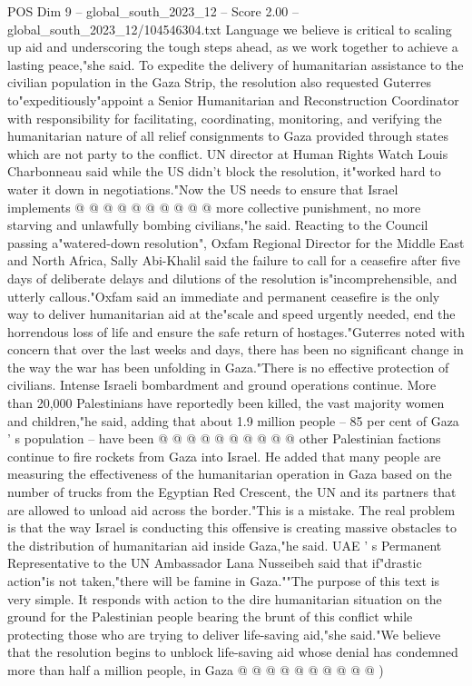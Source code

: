 \begin{textsample}{POS Dim 9 – global\_south\_2023\_12 – Score 2.00 – global\_south\_2023\_12/104546304.txt}
Language we believe is critical to scaling up aid and underscoring the tough steps ahead, as we work together to achieve a lasting peace,"she said.
To expedite the delivery of humanitarian assistance to the civilian population in the Gaza Strip, the resolution also requested Guterres to"expeditiously"appoint a Senior Humanitarian and Reconstruction Coordinator with responsibility for facilitating, coordinating, monitoring, and verifying the humanitarian nature of all relief consignments to Gaza provided through states which are not party to the conflict.
UN director at Human Rights Watch Louis Charbonneau said while the US didn't block the resolution, it"worked hard to water it down in negotiations."Now the US needs to ensure that Israel implements @ @ @ @ @ @ @ @ @ @ more collective punishment, no more starving and unlawfully bombing civilians,"he said.
Reacting to the Council passing a"watered-down resolution", Oxfam Regional Director for the Middle East and North Africa, Sally Abi-Khalil said the failure to call for a ceasefire after five days of deliberate delays and dilutions of the resolution is"incomprehensible, and utterly callous."Oxfam said an immediate and permanent ceasefire is the only way to deliver humanitarian aid at the"scale and speed urgently needed, end the horrendous loss of life and ensure the safe return of hostages."Guterres noted with concern that over the last weeks and days, there has been no significant change in the way the war has been unfolding in Gaza."There is no effective protection of civilians.
Intense Israeli bombardment and ground operations continue.
More than 20,000 Palestinians have reportedly been killed, the vast majority women and children,"he said, adding that about 1.9 million people -- 85 per cent of Gaza ' s population -- have been @ @ @ @ @ @ @ @ @ @ other Palestinian factions continue to fire rockets from Gaza into Israel.
He added that many people are measuring the effectiveness of the humanitarian operation in Gaza based on the number of trucks from the Egyptian Red Crescent, the UN and its partners that are allowed to unload aid across the border."This is a mistake.
The real problem is that the way Israel is conducting this offensive is creating massive obstacles to the distribution of humanitarian aid inside Gaza,"he said.
UAE ' s Permanent Representative to the UN Ambassador Lana Nusseibeh said that if"drastic action"is not taken,"there will be famine in Gaza.""The purpose of this text is very simple.
It responds with action to the dire humanitarian situation on the ground for the Palestinian people bearing the brunt of this conflict while protecting those who are trying to deliver life-saving aid,"she said."We believe that the resolution begins to unblock life-saving aid whose denial has condemned more than half a million people, in Gaza @ @ @ @ @ @ @ @ @ @ )

\end{textsample}
